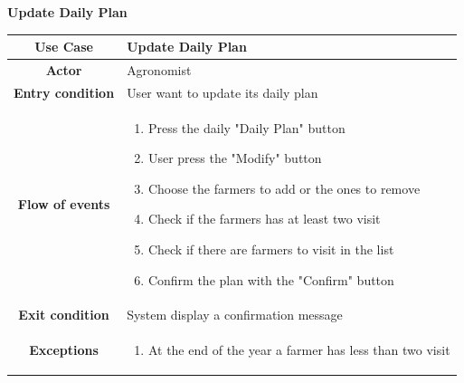 \documentclass[table, 12pt]{article}
\begin{document}
\begin{itemize}
            \begin{table}[H]
                \item[] \textbf{Update Daily Plan}
                \item[] 
                \centering
                \begin{tabular}{|c| m{}|}
                    \hline
                    \textbf{Use Case} & Update Daily Plan\\ \hline
                    \textbf{Actor} & Agronomist\\ \hline
                    \textbf{Entry condition} & User want to update its daily plan\\  \hline
                    \textbf{Flow of events} & \begin{enumerate}
                                                \item Press the daily "Daily Plan" button
                                                \item User press the "Modify" button
                                                \item Choose the farmers to add or the ones to remove
                                                \item Check if the farmers has at least two visit 
                                                \item Check if there are farmers to visit in the list
                                                \item Confirm the plan with the "Confirm" button
                                            \end{enumerate}\\ \hline
                    \textbf{Exit condition} & System display a confirmation message\\ \hline
                    \textbf{Exceptions} &  \begin{enumerate}
                        \item At the end of the year a farmer has less than two visit
                    \end{enumerate}\\ \hline                    
                \end{tabular}
            \end{table}


\end{itemize}
\end{document}

